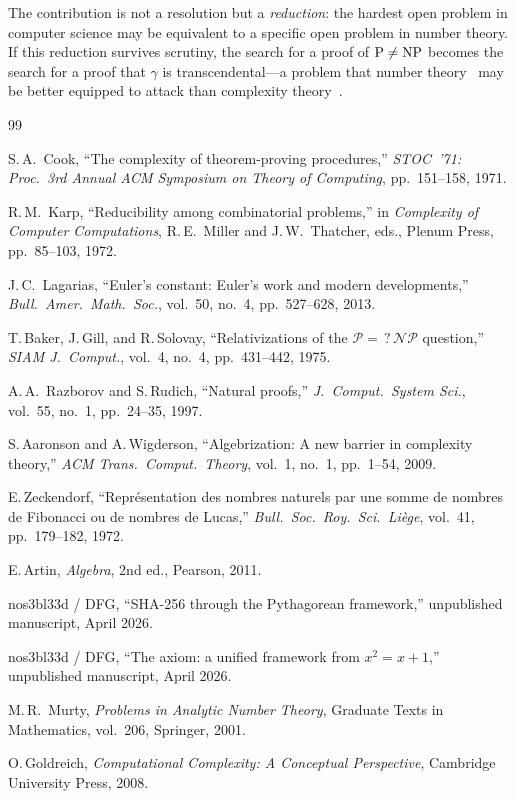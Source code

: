 \documentclass[12pt, a4paper]{article}
\theoremstyle{plain}
\theoremstyle{definition}
\theoremstyle{remark}
\newcommand{\NP}{\textup{NP}}
\newcommand{\PP}{\textup{P}}
\begin{document}
\bigskip

The contribution is not a resolution but a \emph{reduction}: the
hardest open problem in computer science may be equivalent to a
specific open problem in number theory.  If this reduction survives
scrutiny, the search for a proof of $\PP \neq \NP$ becomes the search
for a proof that $\gamma$ is transcendental---a problem that number
theory~\cite{murty2001} may be better equipped to attack than complexity
theory~\cite{goldreich2008}.

\begin{thebibliography}{99}

S.\,A.~Cook,
``The complexity of theorem-proving procedures,''
\emph{STOC~'71: Proc.\ 3rd Annual ACM Symposium on Theory of
Computing}, pp.~151--158, 1971.

R.\,M.~Karp,
``Reducibility among combinatorial problems,''
in \emph{Complexity of Computer Computations}, R.\,E.~Miller and
J.\,W.~Thatcher, eds., Plenum Press, pp.~85--103, 1972.

J.\,C.~Lagarias,
``Euler's constant: Euler's work and modern developments,''
\emph{Bull.\ Amer.\ Math.\ Soc.}, vol.~50, no.~4, pp.~527--628, 2013.

T.\,Baker, J.\,Gill, and R.\,Solovay,
``Relativizations of the $\mathcal{P} =\mathrel{?} \mathcal{NP}$ question,''
\emph{SIAM J.\ Comput.}, vol.~4, no.~4, pp.~431--442, 1975.

A.\,A.~Razborov and S.\,Rudich,
``Natural proofs,''
\emph{J.~Comput.\ System Sci.}, vol.~55, no.~1, pp.~24--35, 1997.

S.\,Aaronson and A.\,Wigderson,
``Algebrization: A new barrier in complexity theory,''
\emph{ACM Trans.\ Comput.\ Theory}, vol.~1, no.~1, pp.~1--54, 2009.

E.\,Zeckendorf,
``Repr\'esentation des nombres naturels par une somme de nombres de
Fibonacci ou de nombres de Lucas,''
\emph{Bull.\ Soc.\ Roy.\ Sci.\ Li\`ege}, vol.~41, pp.~179--182, 1972.

E.\,Artin, \emph{Algebra}, 2nd ed., Pearson, 2011.

nos3bl33d / DFG,
``SHA-256 through the Pythagorean framework,''
unpublished manuscript, April 2026.

nos3bl33d / DFG,
``The axiom: a unified framework from $x^2 = x + 1$,''
unpublished manuscript, April 2026.

M.\,R.~Murty, \emph{Problems in Analytic Number Theory},
Graduate Texts in Mathematics, vol.~206, Springer, 2001.

O.\,Goldreich,
\emph{Computational Complexity: A Conceptual Perspective},
Cambridge University Press, 2008.

\end{thebibliography}
\end{document}
